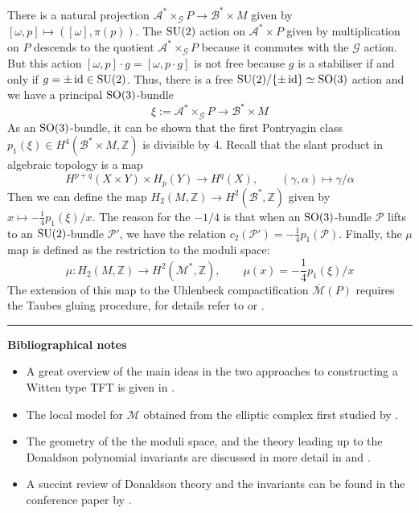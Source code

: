 There is a natural projection $\mathcal{A}^* \times_\mathcal{G} P \to
\mathcal{B}^*\times M$ given by $[\omega,p] \mapsto ([\omega],\pi(p))$.
The $\operatorname{SU}(2)$ action on  $\mathcal{A}^*\times P$ given by multiplication on $P$
descends to the quotient $\mathcal{A}^* \times_\mathcal{G} P$ because it 
commutes with the  $\mathcal{G}$ action.
But this action $[\omega,p]\cdot g = [\omega,p\cdot g]$ is not free because 
$g$ is a stabiliser if and only if $g=\pm \operatorname{id}\in \operatorname{SU}(2)$. Thus, there is a free
$\operatorname{SU}(2) /\{\pm\operatorname{id}\} \simeq \operatorname{SO}(3)$ action and we have a principal $\operatorname{SO}(3)$-bundle
\[
\xi := \mathcal{A}^*\times_{\mathcal{G}} P \to \mathcal{B}^*\times M
\] 
As an $\operatorname{SO}(3)$-bundle, it can be shown that the first Pontryagin class
$p_1(\xi) \in H^4(\mathcal{B}^*\times M,\mathbb{Z})$ is divisible by
4.\cite[Lemma 7.2.1]{morgan} 
Recall that the slant product in algebraic topology is a map 
\[
H^{p+q}(X\times Y) \times H_p(Y) \to H^q(X), \qquad 
(\gamma,\alpha) \mapsto \gamma / \alpha
\] 
Then we can define the map $H_2(M,\mathbb{Z})\to H^2(\mathcal{B}^*,\mathbb{Z})$
given by $x \mapsto -\frac{1}{4} p_1(\xi) / x$. The reason for the $-1 /4$ is
that when an $\operatorname{SO}(3)$-bundle $\mathcal{P}$ lifts  to an $\operatorname{SU}(2)$-bundle
$\mathcal{P}'$, we have the relation %
$c_2(\mathcal{P}')=-\frac{1}{4}p_1(\mathcal{P})$. Finally, the $\mu$ map is
defined as the restriction to the moduli space:
 \[
\mu : H_2(M,\mathbb{Z}) \to H^2(\mathcal{M}^*,\mathbb{Z}),\qquad
\mu(x) = -\frac{1}{4}p_1(\xi) /x
\] 
The extension of this map to the Uhlenbeck compactification 
$\overline{\mathcal{M}}(P)$ requires the Taubes
gluing procedure, for details refer to \cite{morgan} or \cite{donaldson_kronheimer}.




\vspace{5mm}
\hrule 
\vspace{5mm}



\textbf{Bibliographical notes}
{\small
\begin{itemize}
	\item A great overview of the main ideas in the two approaches to
		constructing a Witten type TFT is given in \citet{TQFTbook}.
	\item The local model for $\mathcal{M}$ obtained from the elliptic complex 
		first studied by \citet{local_moduli}.
	\item The geometry of the the moduli space, and the theory leading up to the
		Donaldson polynomial invariants are
		discussed in more detail in \citet{morgan} and
		\citet{donaldson_kronheimer}. 
	\item A succint review of Donaldson theory and the invariants can be found
		in the conference paper by \cite{naber_donaldson}.
\end{itemize}
}
